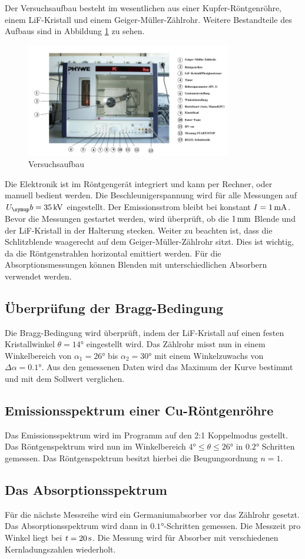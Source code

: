 Der Versuchsaufbau besteht im wesentlichen aus einer Kupfer-Röntgenröhre,
einem LiF-Kristall und einem Geiger-Müller-Zählrohr. Weitere Bestandteile des
Aufbaus sind in Abbildung \ref{fig:aufbau} zu sehen.
\begin{figure}[H]
  \centering
  \includegraphics[width=0.8\textwidth]{bilder/aufbau.pdf}
  \caption{Versuchsaufbau\cite{V602}}
  \label{fig:aufbau}
\end{figure}
Die Elektronik ist im Röntgengerät integriert und kann per Rechner, oder
manuell bedient werden. Die Beschleunigerspannung wird für alle Messungen auf
$U_\su{b}=35\kVolt$ eingestellt. Der Emissionsstrom bleibt bei konstant
$I=1\,\si{\milli\ampere}$. Bevor die Messungen gestartet werden, wird überprüft, ob die $1\,\si{\milli\meter}$
Blende und der LiF-Kristall in der Halterung stecken. Weiter zu beachten ist,
dass die Schlitzblende waagerecht auf dem Geiger-Müller-Zählrohr sitzt. Dies
ist wichtig, da die Röntgenstrahlen horizontal emittiert werden.
Für die Absorptionsmessungen können Blenden mit unterschiedlichen Absorbern
verwendet werden.
\subsection{Überprüfung der Bragg-Bedingung}
Die Bragg-Bedingung wird überprüft, indem der LiF-Kristall auf einen festen
Kristallwinkel $\theta=14°$ eingestellt wird. Das Zählrohr misst nun in einem
Winkelbereich von $\alpha_1=26°$ bis $\alpha_2=30°$ mit einem Winkelzuwachs
von $\Delta\alpha=0.1°$. Aus den gemessenen Daten wird das Maximum der Kurve
bestimmt und mit dem Sollwert verglichen.
\subsection{Emissionsspektrum einer Cu-Röntgenröhre}
Das Emissionsspektrum wird im Programm auf den 2:1 Koppelmodus gestellt. Das
Röntgenspektrum wird nun im Winkelbereich $4°\leq\theta\leq 26°$ in $0.2°$
Schritten gemessen. Das Röntgenspektrum besitzt hierbei die Beugungsordnung
$n=1$.
\subsection{Das Absorptionsspektrum}
Für die nächste Messreihe wird ein Germaniumabsorber vor das Zählrohr gesetzt.
Das Absorptionsspektrum wird dann in $0.1°$-Schritten gemessen. Die Messzeit pro
Winkel liegt bei $t=20\,\si{\second}$. Die Messung wird für Absorber mit verschiedenen
Kernladungszahlen wiederholt.
